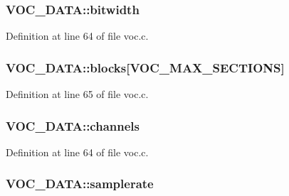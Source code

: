 \subsubsection[{\texorpdfstring{bitwidth}{bitwidth}}]{ V\+O\+C\+\_\+\+D\+A\+T\+A\+::bitwidth}\hypertarget{struct_v_o_c___d_a_t_a_a81f5cdc4e1f5d32b035e58a2f8e789dc}{}\label{struct_v_o_c___d_a_t_a_a81f5cdc4e1f5d32b035e58a2f8e789dc}


Definition at line 64 of file voc.\+c.

\subsubsection[{\texorpdfstring{blocks}{blocks}}]{ V\+O\+C\+\_\+\+D\+A\+T\+A\+::blocks\mbox{[}{\bf V\+O\+C\+\_\+\+M\+A\+X\+\_\+\+S\+E\+C\+T\+I\+O\+NS}\mbox{]}}\hypertarget{struct_v_o_c___d_a_t_a_a01c318507e6cb42462eb57d790b82d7c}{}\label{struct_v_o_c___d_a_t_a_a01c318507e6cb42462eb57d790b82d7c}


Definition at line 65 of file voc.\+c.

\subsubsection[{\texorpdfstring{channels}{channels}}]{ V\+O\+C\+\_\+\+D\+A\+T\+A\+::channels}\hypertarget{struct_v_o_c___d_a_t_a_aa45b0c2d4251107692674020886e899e}{}\label{struct_v_o_c___d_a_t_a_aa45b0c2d4251107692674020886e899e}


Definition at line 64 of file voc.\+c.

\subsubsection[{\texorpdfstring{samplerate}{samplerate}}]{ V\+O\+C\+\_\+\+D\+A\+T\+A\+::samplerate}\hypertarget{struct_v_o_c___d_a_t_a_a6cc30984b5cc250ca490125148fe7a4d}{}\label{struct_v_o_c___d_a_t_a_a6cc30984b5cc250ca490125148fe7a4d}


